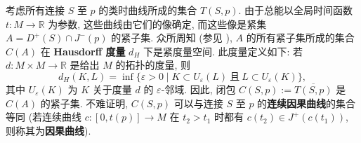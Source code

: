 \begin{RiemannProof}
考虑所有连接 $S$ 至 $p$ 的类时曲线所成的集合 $T(S,p)$. 由于总能以全局时间函数 $t:M\to\mathbb{R}$ 为参数, 这些曲线由它们的像确定, 而这些像是紧集 $A=D^+(S)\cap J^-(p)$ 的紧子集. 众所周知 (参见 ), $A$ 的所有紧子集所成的集合 $C(A)$ 在 \textbf{Hausdorff 度量} $d_H$ 下是紧度量空间. 此度量定义如下: 若 $d:M\times M\to\mathbb{R}$ 是给出 $M$ 的拓扑的度量, 则
\[
  d_H(K,L)=\inf\{\varepsilon>0\mid K\subset U_\varepsilon(L)
       \ \text{且}\ L\subset U_\varepsilon(K)\},
\]
其中 $U_\varepsilon(K)$ 为 $K$ 关于度量 $d$ 的 $\varepsilon$-邻域. 因此, 闭包 $C(S,p):=\overline{T(S,p)}$ 是 $C(A)$ 的紧子集. 不难证明, $C(S,p)$ 可以与连接 $S$ 至 $p$ 的\textbf{连续因果曲线}的集合等同 (若连续曲线 $c:[0,t(p)]\to M$ 在 $t_2>t_1$ 时都有 $c(t_2)\in J^+(c(t_1))$, 则称其为\textbf{因果曲线}).


\end{RiemannProof}
